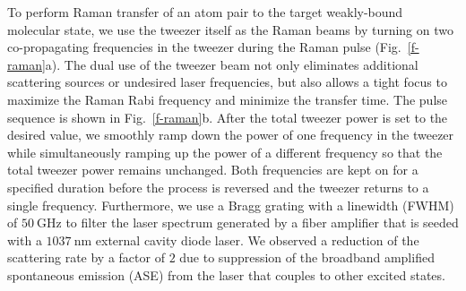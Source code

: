 \documentclass[aps,prl,twocolumn,superscriptaddress]{revtex4-1}
\newcommand{\Na}{\mathrm{Na}}
\newcommand{\Cs}{\mathrm{Cs}}
\begin{document}
To perform Raman transfer of an atom pair to the target weakly-bound molecular state, we use the tweezer itself as the Raman beams by turning on two co-propagating frequencies in the tweezer during the Raman pulse (Fig.~\ref{f-raman}a). The dual use of the tweezer beam not only eliminates additional scattering sources or undesired laser frequencies, but also allows a tight focus to maximize the Raman Rabi frequency and minimize the transfer time. %
The pulse sequence is shown in Fig.~\ref{f-raman}b. %
After the total tweezer power is set to the desired value, we smoothly ramp down the power of one frequency in the tweezer while simultaneously ramping up the power of a different frequency so that the total tweezer power remains unchanged. Both frequencies are kept on for a specified duration before the process is reversed and the tweezer returns to a single frequency.
Furthermore, we use a Bragg grating with a linewidth (FWHM) of $50 ~\mathrm{GHz}$ to filter the laser spectrum generated by a fiber amplifier that is seeded with a $1037~\mathrm{nm}$ external cavity diode laser. We observed a reduction of the scattering rate by a factor of $2$ due to suppression of the broadband amplified spontaneous emission (ASE) from the laser that couples to other excited states.

\end{document}
